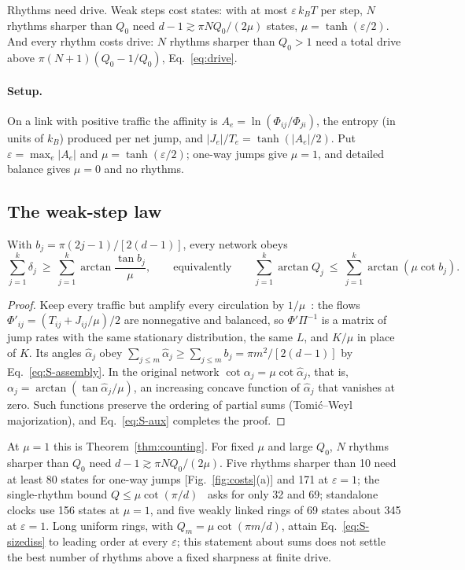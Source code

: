 Rhythms need drive. Weak steps cost states: with at most $\varepsilon\,k_BT$ per step, $N$ rhythms sharper than $Q_0$ need $d-1\gtrsim\pi NQ_0/(2\mu)$ states, $\mu=\tanh(\varepsilon/2)$. And every rhythm costs drive: $N$ rhythms sharper than $Q_0>1$ need a total drive above $\pi(N+1)(Q_0-1/Q_0)$, Eq.~\eqref{eq:drive}.

\paragraph*{Setup.} On a link with positive traffic the affinity is $A_e=\ln(\Phi_{ij}/\Phi_{ji})$, the entropy (in units of $k_B$) produced per net jump, and $|J_e|/T_e=\tanh(|A_e|/2)$. Put $\varepsilon=\max_e|A_e|$ and $\mu=\tanh(\varepsilon/2)$; one-way jumps give $\mu=1$, and detailed balance gives $\mu=0$ and no rhythms.

\subsection{The weak-step law}\label{sec:weakstep}

With $b_j=\pi(2j-1)/[2(d-1)]$, every network obeys
\begin{equation}
\sum_{j=1}^{k}\delta_j\ \ge\ \sum_{j=1}^{k}\arctan\frac{\tan b_j}{\mu},
\qquad\text{equivalently}\qquad
\sum_{j=1}^{k}\arctan Q_j\ \le\ \sum_{j=1}^{k}\arctan(\mu\cot b_j).
\label{eq:S-sizediss}
\end{equation}

\begin{proof}
Keep every traffic but amplify every circulation by $1/\mu$~\cite{xu2025}: the flows $\Phi'_{ij}=(T_{ij}+J_{ij}/\mu)/2$ are nonnegative and balanced, so $\Phi'\Pi^{-1}$ is a matrix of jump rates with the same stationary distribution, the same $L$, and $K/\mu$ in place of $K$. Its angles $\hat\alpha_j$ obey $\sum_{j\le m}\hat\alpha_j\ge\sum_{j\le m}b_j=\pi m^2/[2(d-1)]$ by Eq.~\eqref{eq:S-assembly}. In the original network $\cot\alpha_j=\mu\cot\hat\alpha_j$, that is, $\alpha_j=\arctan(\tan\hat\alpha_j/\mu)$, an increasing concave function of $\hat\alpha_j$ that vanishes at zero. Such functions preserve the ordering of partial sums (Tomi\'c--Weyl majorization), and Eq.~\eqref{eq:S-aux} completes the proof.
\end{proof}

\noindent At $\mu=1$ this is Theorem~\ref{thm:counting}. For fixed $\mu$ and large $Q_0$, $N$ rhythms sharper than $Q_0$ need $d-1\gtrsim\pi NQ_0/(2\mu)$. Five rhythms sharper than 10 need at least 80 states for one-way jumps [Fig.~\ref{fig:costs}(a)] and 171 at $\varepsilon=1$; the single-rhythm bound $Q\le \mu\cot(\pi/d)$~\cite{ohga2023} asks for only 32 and 69; standalone clocks use 156 states at $\mu=1$, and five weakly linked rings of 69 states about 345 at $\varepsilon=1$. Long uniform rings, with $Q_m=\mu\cot(\pi m/d)$, attain Eq.~\eqref{eq:S-sizediss} to leading order at every $\varepsilon$; this statement about sums does not settle the best number of rhythms above a fixed sharpness at finite drive.

